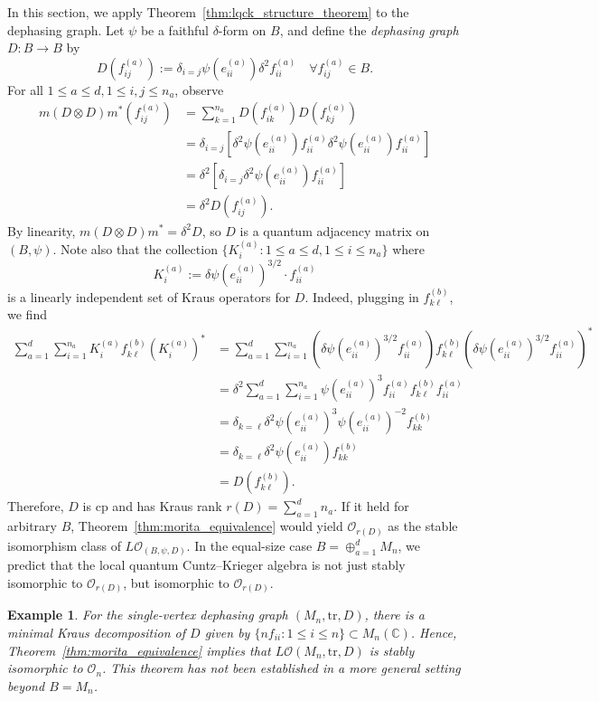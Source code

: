\documentclass[11pt]{article}
\theoremstyle{plain}
\theoremstyle{nonumberplain}
\theoremstyle{plain}
\newtheorem{example}[lemma]{Example}
\theoremstyle{nonumberplain}
\newcommand\1{{\bf 1}}
\newcommand\cO{{\mathcal O}}
\newcommand{\tr}{\text{tr}} %
\newcommand{\<}{\left\langle}
\renewcommand{\>}{\right\rangle}
\begin{document}
In this section, we apply Theorem~\ref{thm:lqck_structure_theorem} to the dephasing graph. Let $\psi$ be a faithful $\delta$-form on $B$, and define the {\em dephasing graph} $D:B\to B$ by
\[ 
D(f_{ij}^{(a)}):=\delta_{i=j} \psi(e_{ii}^{(a)})\delta^2 f_{ii}^{(a)}
\quad \forall f_{ij}^{(a)} \in B.
\]
For all $1\leq a\leq d,1\leq i,j\leq n_a$, observe
\begin{align*}
m(D\otimes D)m^*(f^{(a)}_{ij})
&=
\sum_{k=1}^{n_a} D(f_{ik}^{(a)})D(f_{kj}^{(a)})\\
&=\delta_{i=j}\left[\delta^2 \psi(e_{ii}^{(a)}) f_{ii}^{(a)} \delta^2 \psi(e_{ii}^{(a)})f_{ii}^{(a)}\right]\\
&=\delta^2 \left[\delta_{i=j} \delta^2 \psi(e_{ii}^{(a)})f_{ii}^{(a)}\right]\\
&= \delta^2 D(f_{ij}^{(a)}).
\end{align*}
By linearity, $m  (D\otimes D)  m^* = \delta^2 D$, so $D$ is a quantum adjacency matrix on $(B,\psi)$. Note also that the collection $\{K_i^{(a)}:1\leq a \leq d,1\leq i\leq n_a\}$ where 
\[K_i^{(a)}:=\delta \psi(e_{ii}^{(a)})^{3/2} \cdot f_{ii}^{(a)}\] is a linearly independent set of Kraus operators for $D$. Indeed, plugging in $f_{k\ell}^{(b)}$, we find
\begin{align*}
\sum_{a=1}^d \sum_{i=1}^{n_a} K_i^{(a)}f_{k\ell}^{(b)}(K_i^{(a)})^*
&=\sum_{a=1}^d\sum_{i=1}^{n_a} (\delta\psi(e_{ii}^{(a)})^{3/2}f_{ii}^{(a)} )f_{k\ell}^{(b)} (\delta\psi(e_{ii}^{(a)})^{3/2}f_{ii}^{(a)})^*\\
&=
\delta^2\sum_{a=1}^d\sum_{i=1}^{n_a} \psi(e_{ii}^{(a)})^3 f_{ii}^{(a)} f_{k\ell}^{(b)}f_{ii}^{(a)}\\
&=
\delta_{k=\ell}\delta^2 \psi(e_{ii}^{(a)})^{3 }\psi(e_{ii}^{(a)})^{-2}f_{kk}^{(b)}\\
&=
\delta_{k=\ell}\delta^2 \psi(e_{ii}^{(a)})f_{kk}^{(b)}\\
&=
D(f_{k\ell}^{(b)}).
\end{align*}
Therefore, $D$ is cp and has Kraus rank $r(D)=\sum_{a=1}^d n_a$. If it held for arbitrary $B$, Theorem~\ref{thm:morita_equivalence} would yield $\cO_{r(D)}$ as the stable isomorphism class of $L\cO_(B,\psi,D)$. In the equal-size case $B=\oplus_{a=1}^d M_n$, we predict that the local quantum Cuntz--Krieger algebra is not just stably isomorphic to $\cO_{r(D)}$, but isomorphic to $\cO_{r(D)}.$ 



\begin{example}

For the single-vertex dephasing graph $(M_n,\tr,D)$, there is a minimal Kraus decomposition of $D$ given by $\{n f_{ii}: 1\leq i\leq n\}\subset M_n(\mathbb{C})$. Hence, Theorem~\ref{thm:morita_equivalence} implies that $L\cO(M_n,\tr,D)$ is stably isomorphic to $\cO_n$. This theorem has not been established in a more general setting beyond $B=M_n$.

\end{example}
\end{document}
